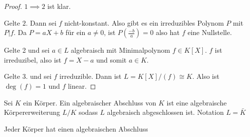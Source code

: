 \begin{proof}

$1\implies 2$ ist klar.

Gelte $2$. Dann sei $f$ nicht-konstant. Also gibt es ein irreduzibles Polynom $P$ mit $P|f$. Da $P=aX+b$ für ein $a\neq 0$, ist $P(\frac{-b}{a})=0$ also hat $f$ eine Nullstelle.

Gelte 2 und sei $a\in L$ algebraisch mit Minimalpolynom $f\in K[X]$. $f$ ist irreduzibel, also ist $f=X-a$ und somit $a\in K$.

Gelte 3. und sei $f$ irreduzible. Dann ist $L=K[X]/(f)\cong K$. Also ist $\deg(f)=1$ und $f$ linear.

\end{proof}

\begin{Def}
    Sei $K$ ein Körper. Ein algebraischer Abschluss von $K$ ist eine algebraische Körpererweiterung $L/K$ sodass $L$ algebraisch abgeschlossen ist. Notation $L=\bar K$
\end{Def}
\begin{Satz}
    Jeder Körper hat einen algebraischen Abschluss
\end{Satz}
